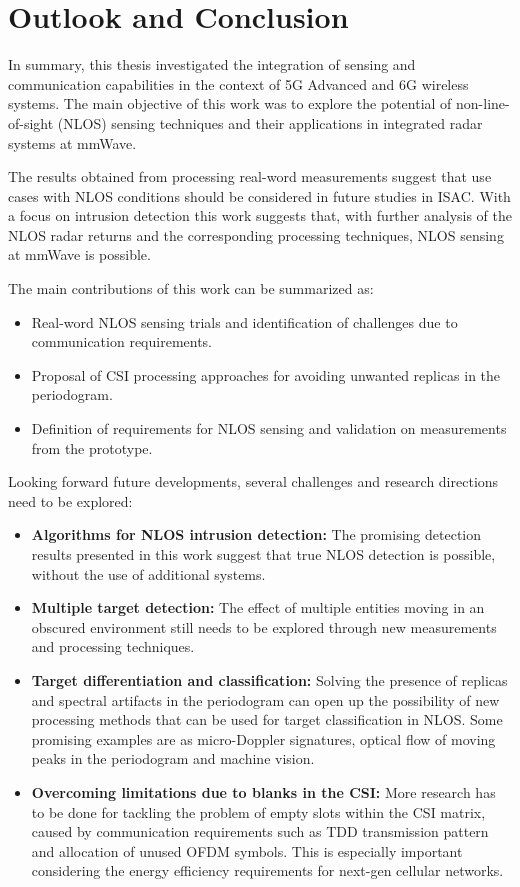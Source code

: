 \chapter{Outlook and Conclusion}

In summary, this thesis investigated the integration of sensing and communication capabilities in the context of 5G Advanced and 6G wireless systems. 
The main objective of this work was to explore the potential of non-line-of-sight (NLOS) sensing techniques and their applications in integrated radar systems at mmWave. 

The results obtained from processing real-word measurements suggest that use cases with NLOS conditions should be considered in future studies in ISAC.
With a focus on intrusion detection this work suggests that, with further analysis of the NLOS radar returns and the corresponding processing techniques, NLOS sensing at mmWave is possible.

The main contributions of this work can be summarized as:

\begin{itemize}
	\item Real-word NLOS sensing trials and identification of challenges due to communication requirements.
	\item Proposal of CSI processing approaches for avoiding unwanted replicas in the periodogram.
	\item Definition of requirements for NLOS sensing and validation on measurements from the prototype.
\end{itemize}

Looking forward future developments, several challenges and research directions need to be explored:

\begin{itemize}
	\item \textbf{Algorithms for NLOS intrusion detection:} The promising detection results presented in this work suggest that true NLOS detection is possible, without the use of additional systems.
	\item \textbf{Multiple target detection:} The effect of multiple entities moving in an obscured environment still needs to be explored through new measurements and processing techniques.
	\item \textbf{Target differentiation and classification:} Solving the presence of replicas and spectral artifacts in the periodogram can open up the possibility of new processing methods that can be used for target classification in NLOS. Some promising examples are as micro-Doppler signatures, optical flow of moving peaks in the periodogram and machine vision.
	\item \textbf{Overcoming limitations due to blanks in the CSI:} More research has to be done for tackling the problem of empty slots within the CSI matrix, caused by communication requirements such as TDD transmission pattern and allocation of unused OFDM symbols. This is especially important considering the energy efficiency requirements for next-gen cellular networks.
\end{itemize}
